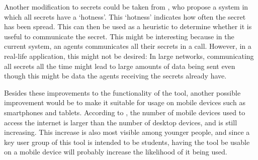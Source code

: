 Another modification to secrets could be taken from \textcite{demers_epidemic_1988}, who propose a system in which all secrets have a `hotness'.
This `hotness' indicates how often the secret has been spread.
This can then be used as a heuristic to determine whether it is useful to communicate the secret.
This might be interesting because in the current system, an agents communicates all their secrets in a call.
However, in a real-life application, this might not be desired:
In large networks, communicating all secrets all the time might lead to large amounts of data being sent even though this might be data the agents receiving the secrets already have.

Besides these improvements to the functionality of the tool, 
another possible improvement would be to make it suitable for usage on mobile devices such as smartphones and tablets.
According to \textcite{cisco_cisco_2020}, the number of mobile devices used to access the internet is larger than the number of desktop devices, and is still increasing.
This increase is also most visible among younger people,
and since a key user group of this tool is intended to be students,
having the tool be usable on a mobile device will probably increase the likelihood of it being used.